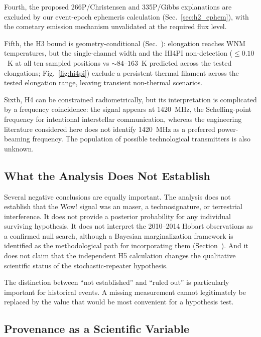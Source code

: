 \documentclass[twocolumn]{aastex701}
\begin{document}
Fourth, the proposed 266P/Christensen and 335P/Gibbs explanations are excluded by our event-epoch ephemeris calculation (Sec.~\ref{sec:h2_ephem}), with the cometary emission mechanism unvalidated at the required flux level.

Fifth, the H3 bound is geometry-conditional (Sec.~): elongation reaches WNM temperatures, but the single-channel width and the HI4PI non-detection ($\leq0.10$~K at all ten sampled positions vs $\sim84$--$163$~K predicted across the tested elongations; Fig.~\ref{fig:hi4pi}) exclude a persistent thermal filament across the tested elongation range, leaving transient non-thermal scenarios.

Sixth, H4 can be constrained radiometrically, but its interpretation is complicated by a frequency coincidence: the signal appears at 1420~MHz, the Schelling-point frequency for intentional interstellar communication, whereas the engineering literature considered here does not identify 1420~MHz as a preferred power-beaming frequency. The population of possible technological transmitters is also unknown.

\subsection{What the Analysis Does Not Establish}

Several negative conclusions are equally important. The analysis does not establish that the Wow! signal was an  maser, a technosignature, or terrestrial interference. It does not provide a posterior probability for any individual surviving hypothesis. It does not interpret the 2010--2014 Hobart observations as a confirmed null search, although a Bayesian marginalization framework is identified as the methodological path for incorporating them (Section~). And it does not claim that the independent H5 calculation changes the qualitative scientific status of the stochastic-repeater hypothesis.

The distinction between ``not established'' and ``ruled out'' is particularly important for historical events. A missing measurement cannot legitimately be replaced by the value that would be most convenient for a hypothesis test.

\subsection{Provenance as a Scientific Variable}
\end{document}
